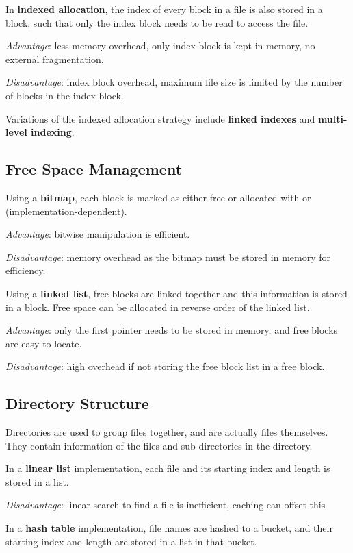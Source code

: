 In \textbf{indexed allocation}, the index of every block in a file is also stored in a block, such that only the index block needs to be read to access the file.

\textit{Advantage}: less memory overhead, only index block is kept in memory, no external fragmentation.

\textit{Disadvantage}: index block overhead, maximum file size is limited by the number of blocks in the index block.

Variations of the indexed allocation strategy include \textbf{linked indexes} and \textbf{multi-level indexing}.


\subsection{Free Space Management}
Using a \textbf{bitmap}, each block is marked as either free or allocated with  or  (implementation-dependent).

\textit{Advantage}: bitwise manipulation is efficient.

\textit{Disadvantage}: memory overhead as the bitmap must be stored in memory for efficiency.

Using a \textbf{linked list}, free blocks are linked together and this information is stored in a block. Free space can be allocated in reverse order of the linked list.

\textit{Advantage}: only the first pointer needs to be stored in memory, and free blocks are easy to locate.

\textit{Disadvantage}: high overhead if not storing the free block list in a free block.


\subsection{Directory Structure}
Directories are used to group files together, and are actually files themselves.
They contain information of the files and sub-directories in the directory.

In a \textbf{linear list} implementation, each file and its starting index and length is stored in a list.

\textit{Disadvantage}: linear search to find a file is inefficient, caching can offset this

In a \textbf{hash table} implementation, file names are hashed to a bucket, and their starting index and length are stored in a list in that bucket.

